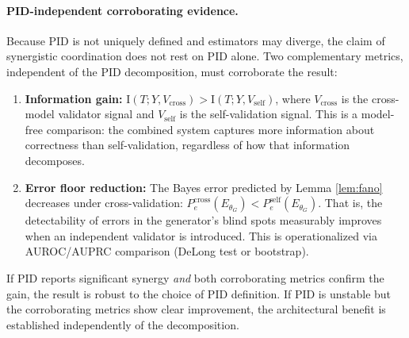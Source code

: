 \documentclass[11pt,a4paper]{article}
\theoremstyle{remark}
\newcommand{\MI}{\mathrm{I}}
\begin{document}
\paragraph{PID-independent corroborating evidence.} Because PID is not uniquely defined and estimators may diverge, the claim of synergistic coordination does not rest on PID alone. Two complementary metrics, independent of the PID decomposition, must corroborate the result:
\begin{enumerate}
  \item \textbf{Information gain:} $\MI(T; Y, V_{\mathrm{cross}}) > \MI(T; Y, V_{\mathrm{self}})$, where $V_{\mathrm{cross}}$ is the cross-model validator signal and $V_{\mathrm{self}}$ is the self-validation signal. This is a model-free comparison: the combined system captures more information about correctness than self-validation, regardless of how that information decomposes.
  \item \textbf{Error floor reduction:} The Bayes error predicted by Lemma \ref{lem:fano} decreases under cross-validation: $P_e^{\mathrm{cross}}(E_{\theta_G}) < P_e^{\mathrm{self}}(E_{\theta_G})$. That is, the detectability of errors in the generator's blind spots measurably improves when an independent validator is introduced. This is operationalized via AUROC/AUPRC comparison (DeLong test or bootstrap).
\end{enumerate}
If PID reports significant synergy \emph{and} both corroborating metrics confirm the gain, the result is robust to the choice of PID definition. If PID is unstable but the corroborating metrics show clear improvement, the architectural benefit is established independently of the decomposition.
\end{document}
